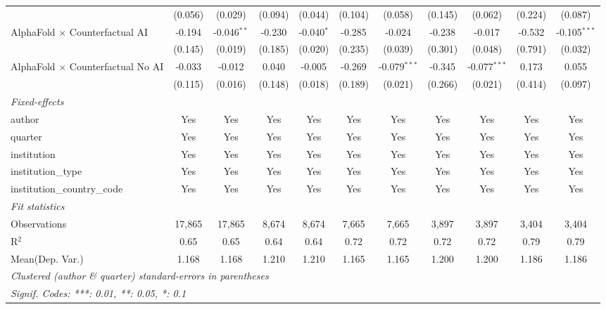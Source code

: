 \begin{tabular}{lcccccccccc}
                                            & (0.056)       & (0.029)       & (0.094)      & (0.044)      & (0.104)      & (0.058)        & (0.145) & (0.062)        & (0.224) & (0.087)\\   
   AlphaFold $\times$ Counterfactual AI     & -0.194        & -0.046$^{**}$ & -0.230       & -0.040$^{*}$ & -0.285       & -0.024         & -0.238  & -0.017         & -0.532  & -0.105$^{***}$\\   
                                            & (0.145)       & (0.019)       & (0.185)      & (0.020)      & (0.235)      & (0.039)        & (0.301) & (0.048)        & (0.791) & (0.032)\\   
   AlphaFold $\times$ Counterfactual No AI  & -0.033        & -0.012        & 0.040        & -0.005       & -0.269       & -0.079$^{***}$ & -0.345  & -0.077$^{***}$ & 0.173   & 0.055\\   
                                            & (0.115)       & (0.016)       & (0.148)      & (0.018)      & (0.189)      & (0.021)        & (0.266) & (0.021)        & (0.414) & (0.097)\\   
   \midrule
   \emph{Fixed-effects}\\
   author                                   & Yes           & Yes           & Yes          & Yes          & Yes          & Yes            & Yes     & Yes            & Yes     & Yes\\  
   quarter                                  & Yes           & Yes           & Yes          & Yes          & Yes          & Yes            & Yes     & Yes            & Yes     & Yes\\  
   institution                              & Yes           & Yes           & Yes          & Yes          & Yes          & Yes            & Yes     & Yes            & Yes     & Yes\\  
   institution\_type                        & Yes           & Yes           & Yes          & Yes          & Yes          & Yes            & Yes     & Yes            & Yes     & Yes\\  
   institution\_country\_code               & Yes           & Yes           & Yes          & Yes          & Yes          & Yes            & Yes     & Yes            & Yes     & Yes\\  
   \midrule
   \emph{Fit statistics}\\
   Observations                             & 17,865        & 17,865        & 8,674        & 8,674        & 7,665        & 7,665          & 3,897   & 3,897          & 3,404   & 3,404\\  
   R$^2$                                    & 0.65          & 0.65          & 0.64         & 0.64         & 0.72         & 0.72           & 0.72    & 0.72           & 0.79    & 0.79\\  
Mean(Dep. Var.) & 1.168 & 1.168 & 1.210 & 1.210 & 1.165 & 1.165 & 1.200 & 1.200 & 1.186 & 1.186 \\
   \midrule \midrule
   \multicolumn{11}{l}{\emph{Clustered (author \& quarter) standard-errors in parentheses}}\\
   \multicolumn{11}{l}{\emph{Signif. Codes: ***: 0.01, **: 0.05, *: 0.1}}\\
\end{tabular}
\par\endgroup
